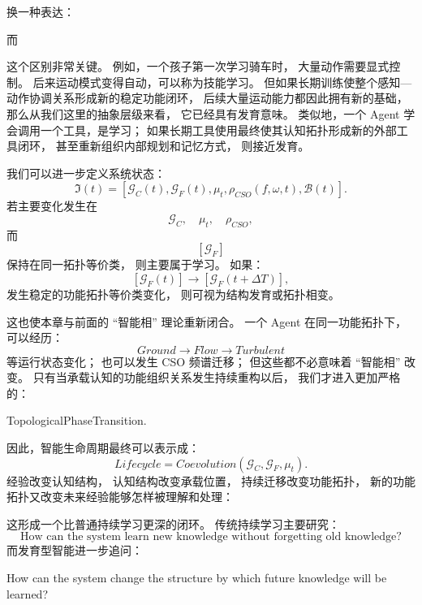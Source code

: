 换一种表达：
\begin{statementbox}
\centering
{}
\end{statementbox}
而
\begin{statementbox}
\centering
{}
\end{statementbox}

这个区别非常关键。
例如，一个孩子第一次学习骑车时，
大量动作需要显式控制。
后来运动模式变得自动，可以称为技能学习。
但如果长期训练使整个感知—动作协调关系形成新的稳定功能闭环，
后续大量运动能力都因此拥有新的基础，
那么从我们这里的抽象层级来看，
它已经具有发育意味。
类似地，一个 Agent 学会调用一个工具，是学习；
如果长期工具使用最终使其认知拓扑形成新的外部工具闭环，
甚至重新组织内部规划和记忆方式，
则接近发育。

我们可以进一步定义系统状态：
\[
\mathfrak I(t)
=
[
\mathcal G_C(t),
\mathcal G_F(t),
\mu_t,
\rho_{CSO}(f,\omega,t),
\mathcal B(t)
].
\]
若主要变化发生在
\[
\mathcal G_C,\quad
\mu_t,\quad
\rho_{CSO},
\]
而
\[
[\mathcal G_F]
\]
保持在同一拓扑等价类，
则主要属于学习。
如果：
\[
[\mathcal G_F(t)]
\rightarrow
[\mathcal G_F(t+\Delta T)],
\]
发生稳定的功能拓扑等价类变化，
则可视为结构发育或拓扑相变。

这也使本章与前面的 ``智能相'' 理论重新闭合。
一个 Agent 在同一功能拓扑下，可以经历：
\[
Ground
\rightarrow
Flow
\rightarrow
Turbulent
\]
等运行状态变化；
也可以发生 CSO 频谱迁移；
但这些都不必意味着 ``智能相'' 改变。
只有当承载认知的功能组织关系发生持续重构以后，
我们才进入更加严格的：
\begin{statementbox}
TopologicalPhaseTransition.
\end{statementbox}

因此，智能生命周期最终可以表示成：
\[
\boxed{
Lifecycle
=
Coevolution
\left(
\mathcal G_C,
\mathcal G_F,
\mu_t
\right).
}
\]
经验改变认知结构，
认知结构改变承载位置，
持续迁移改变功能拓扑，
新的功能拓扑又改变未来经验能够怎样被理解和处理：
\begin{statementbox}
\centering
{}
\end{statementbox}

这形成一个比普通持续学习更深的闭环。
传统持续学习主要研究：
\[
\text{How can the system learn new knowledge without forgetting old knowledge?}
\]
而发育型智能进一步追问：
\begin{statementbox}
How can the system change the structure by which future knowledge will be learned?
\end{statementbox}

